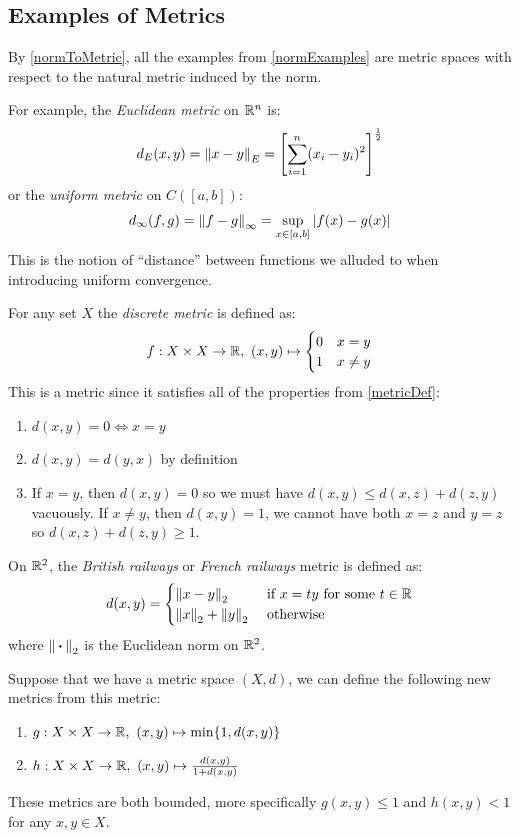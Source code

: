 \documentclass[../main.tex]{subfiles}
\begin{document}
\subsection{Examples of Metrics}
\begin{remark}
  By \cref{normToMetric}, all the examples from \cref{normExamples} are metric spaces with respect to the natural metric induced by the norm.

  For example, the \textit{Euclidean metric} on $\mathbb{R}^n$ is:
  \[
    d_{E}(x, y) = \left\lVert x - y \right\rVert_{E} = \left[\sum_{i = 1}^{n} (x_i - y_i)^2\right]^{\frac{1}{2}}
  \]
  or the \textit{uniform metric} on $C([a, b])$:
  \begin{equation}
    d_{\infty}(f, g) = \left\lVert f - g \right\rVert_{\infty} = \sup_{x \in [a, b]} |f(x) - g(x)| \label{unifMetric}
  \end{equation}
  This is the notion of ``distance'' between functions we alluded to when introducing uniform convergence.
\end{remark}
\begin{example}
  For any set $X$ the \textit{discrete metric} is defined as:
  \[
    f: X \times X \to \mathbb{R},\ (x, y) \mapsto \begin{cases}
    0 & x = y \\
    1 & x \neq y
    \end{cases}
  \]
  This is a metric since it satisfies all of the properties from \cref{metricDef}:
  \begin{enumerate}
    \item $d(x, y) = 0 \iff x = y$
    \item $d(x, y) = d(y, x)$ by definition
    \item If $x = y$, then $d(x, y) = 0$ so we must have $d(x, y) \leq d(x, z) + d(z, y)$ vacuously.
      If $x \neq y$, then $d(x, y) = 1$, we cannot have both $x = z$ and $y = z$ so $d(x, z) + d(z, y) \geq 1$.
  \end{enumerate}
\end{example}
\begin{example} \label{railwayMetric}
  On $\mathbb{R}^2$, the \textit{British railways} or \textit{French railways} metric is defined as:
  \[
    d(x, y) = \begin{cases}
    \left\lVert x - y \right\rVert_2 & \text{ if } x = ty \text{ for some } t \in \mathbb{R}\\
    \left\lVert x \right\rVert_2 + \left\lVert y \right\rVert_2 & \text{ otherwise }
    \end{cases}
  \]
  where $\left\lVert {\hspace{0.18em}\boldsymbol{\cdot}\hspace{0.18em}} \right\rVert_2$ is the Euclidean norm on $\mathbb{R}^2$.
\end{example}
\begin{example}
  Suppose that we have a metric space $(X, d)$, we can define the following new metrics from this metric:
  \begin{enumerate}
    \item $g: X \times X \to \mathbb{R},\ (x, y) \mapsto \min\{1, d(x, y)\}$
    \item $h: X \times X \to \mathbb{R},\ (x, y) \mapsto \frac{d(x, y)}{1 + d(x, y)}$
  \end{enumerate}
  These metrics are both bounded, more specifically $g(x, y) \leq 1$ and $h(x, y) < 1$ for any $x, y \in X$.
\end{example}
\end{document}
